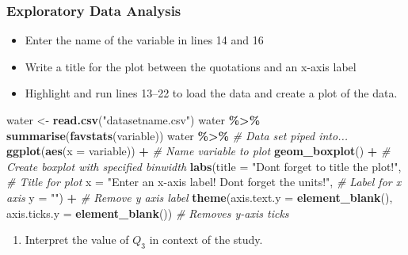 \documentclass[
]{report}
\newenvironment{Shaded}{\begin{snugshade}}{\end{snugshade}}
\newcommand{\AttributeTok}[1]{\textcolor[rgb]{0.13,0.29,0.53}{#1}}
\newcommand{\CommentTok}[1]{\textcolor[rgb]{0.56,0.35,0.01}{\textit{#1}}}
\newcommand{\FunctionTok}[1]{\textcolor[rgb]{0.13,0.29,0.53}{\textbf{#1}}}
\newcommand{\NormalTok}[1]{#1}
\newcommand{\OtherTok}[1]{\textcolor[rgb]{0.56,0.35,0.01}{#1}}
\newcommand{\SpecialCharTok}[1]{\textcolor[rgb]{0.81,0.36,0.00}{\textbf{#1}}}
\newcommand{\StringTok}[1]{\textcolor[rgb]{0.31,0.60,0.02}{#1}}
\providecommand{\tightlist}{%
  \setlength{\itemsep}{0pt}\setlength{\parskip}{0pt}}
\begin{document}
\subsubsection*{Exploratory Data Analysis}\label{exploratory-data-analysis-1}

\begin{itemize}
\item
  Enter the name of the variable in lines 14 and 16
\item
  Write a title for the plot between the quotations and an x-axis label
\item
  Highlight and run lines 13--22 to load the data and create a plot of the data.
\end{itemize}

\begin{Shaded}
\begin{Highlighting}[]
\NormalTok{water }\OtherTok{\textless{}{-}} \FunctionTok{read.csv}\NormalTok{(}\StringTok{"datasetname.csv"}\NormalTok{)}
\NormalTok{water }\SpecialCharTok{\%\textgreater{}\%}
    \FunctionTok{summarise}\NormalTok{(}\FunctionTok{favstats}\NormalTok{(variable))}
\NormalTok{water }\SpecialCharTok{\%\textgreater{}\%} \CommentTok{\# Data set piped into...}
    \FunctionTok{ggplot}\NormalTok{(}\FunctionTok{aes}\NormalTok{(}\AttributeTok{x =}\NormalTok{ variable)) }\SpecialCharTok{+}   \CommentTok{\# Name variable to plot}
    \FunctionTok{geom\_boxplot}\NormalTok{() }\SpecialCharTok{+}  \CommentTok{\# Create boxplot with specified binwidth}
    \FunctionTok{labs}\NormalTok{(}\AttributeTok{title =} \StringTok{"Don\textquotesingle{}t forget to title the plot!"}\NormalTok{, }\CommentTok{\# Title for plot}
         \AttributeTok{x =} \StringTok{"Enter an x{-}axis label! Don\textquotesingle{}t forget the units!"}\NormalTok{, }\CommentTok{\# Label for x axis}
         \AttributeTok{y =} \StringTok{""}\NormalTok{) }\SpecialCharTok{+} \CommentTok{\# Remove y axis label}
    \FunctionTok{theme}\NormalTok{(}\AttributeTok{axis.text.y =} \FunctionTok{element\_blank}\NormalTok{(), }
          \AttributeTok{axis.ticks.y =} \FunctionTok{element\_blank}\NormalTok{()) }\CommentTok{\# Removes y{-}axis ticks}
\end{Highlighting}
\end{Shaded}

\begin{enumerate}
\def\labelenumi{\arabic{enumi}.}
\setcounter{enumi}{4}
\tightlist
\item
  Interpret the value of \(Q_3\) in context of the study.
\end{enumerate}
\end{document}
